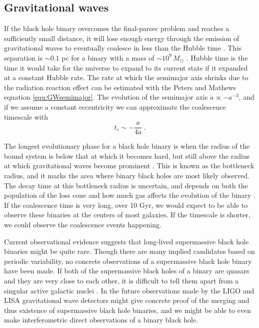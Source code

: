 \documentclass[english, oneside]{HYgradu}
\begin{document}
\subsection{Gravitational waves}

If the black hole binary overcomes the final-parsec problem and reaches a sufficiently small distance, it will lose enough energy through the emission of gravitational waves to eventually coalesce in less than the Hubble time \citep{milosavljevic:2003}. This separation is $\sim 0.1$ pc for a binary with a mass of $\sim 10^9 \, M_\odot$ \citep{rantala:2018}. Hubble time is the time it would take for the universe to expand to its current state if it expanded at a constant Hubble rate. The rate at which the semimajor axis shrinks due to the radiation reaction effect can be estimated with the Peters and Mathews equation \eqref{equ:GWsemimajor}. The evolution of the semimajor axis $\dot{a} \propto -a^{-3}$, and if we assume a constant eccentricity we can approximate the coalescence timescale with \citep{bt-galdyn}
\begin{equation}
t_c \sim -\frac{a}{4\dot{a}} \ .
\end{equation}

The longest evolutionary phase for a black hole binary is when the radius of the bound system is below that at which it becomes hard, but still above the radius at which gravitational waves become prominent \citep{begelman:1980}. This is known as the bottleneck radius, and it marks the area where binary black holes are most likely observed. The decay time at this bottleneck radius is uncertain, and depends on both the population of the loss cone and how much gas affects the evolution of the binary \citep{bt-galdyn}. If the coalescence time is very long, over 10 Gyr, we would expect to be able to observe these binaries at the centers of most galaxies. If the timescale is shorter, we could observe the coalescence events happening.

Current observational evidence suggests that long-lived supermassive black hole binaries might be quite rare. Though there are many implied candidates based on periodic variability, no concrete observations of a supermassive black hole binary have been made. If both of the supermassive black holes of a binary are quasars and they are very close to each other, it is difficult to tell them apart from a singular active galactic nuclei \citep{roedig:2014}. In the future observations made by the LIGO and LISA gravitational wave detectors might give concrete proof of the merging and thus existence of supermassive black hole binaries, and we might be able to even make interferometric direct observations of a binary black hole.
\end{document}
